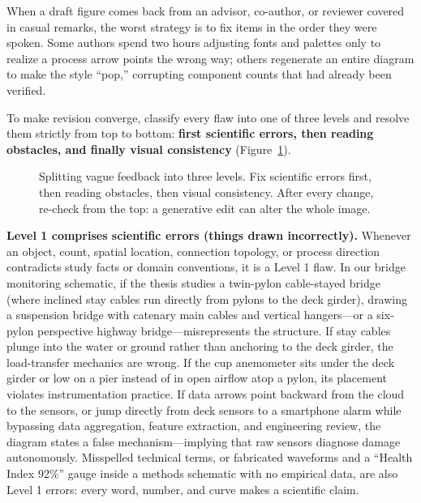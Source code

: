 When a draft figure comes back from an advisor, co-author, or reviewer covered in casual remarks, the worst strategy is to fix items in the order they were spoken. Some authors spend two hours adjusting fonts and palettes only to realize a process arrow points the wrong way; others regenerate an entire diagram to make the style ``pop,'' corrupting component counts that had already been verified.

To make revision converge, classify every flaw into one of three levels and resolve them strictly from top to bottom: \textbf{first scientific errors, then reading obstacles, and finally visual consistency} (Figure~\ref{fig:ch11-01}).

\begin{figure}[htbp]\centering
\resizebox{\linewidth}{!}{}
\caption{Splitting vague feedback into three levels. Fix scientific errors first, then reading obstacles, then visual consistency. After every change, re-check from the top: a generative edit can alter the whole image.}\label{fig:ch11-01}
\end{figure}

\textbf{Level 1 comprises scientific errors (things drawn incorrectly).} Whenever an object, count, spatial location, connection topology, or process direction contradicts study facts or domain conventions, it is a Level 1 flaw. In our bridge monitoring schematic, if the thesis studies a twin-pylon cable-stayed bridge (where inclined stay cables run directly from pylons to the deck girder), drawing a suspension bridge with catenary main cables and vertical hangers---or a six-pylon perspective highway bridge---misrepresents the structure. If stay cables plunge into the water or ground rather than anchoring to the deck girder, the load-transfer mechanics are wrong. If the cup anemometer sits under the deck girder or low on a pier instead of in open airflow atop a pylon, its placement violates instrumentation practice. If data arrows point backward from the cloud to the sensors, or jump directly from deck sensors to a smartphone alarm while bypassing data aggregation, feature extraction, and engineering review, the diagram states a false mechanism---implying that raw sensors diagnose damage autonomously. Misspelled technical terms, or fabricated waveforms and a ``Health Index 92\%'' gauge inside a methods schematic with no empirical data, are also Level 1 errors: every word, number, and curve makes a scientific claim.

